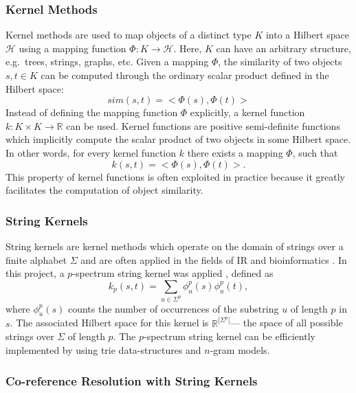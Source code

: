 \subsubsection{Kernel Methods}
Kernel methods are used to map objects of a
distinct type $K$ into a Hilbert space $\mathcal{H}$ using a mapping function $\Phi :
K \rightarrow \mathcal{H}$. Here, $K$ can have an arbitrary structure, e.g.\ trees, strings,
graphs, etc. Given a mapping $\Phi$, the similarity of two objects $s,t \in K$ can be computed
through the ordinary scalar product defined in the Hilbert space:
\[sim(s,t) = <\Phi(s),\Phi(t)>\]
Instead of defining the mapping function $\Phi$ explicitly, a kernel function $k : K \times K
\rightarrow \mathbb{R}$ can be used. Kernel functions are positive semi-definite functions
which implicitly compute the scalar product of two objects in some Hilbert space. In other words, for every
kernel function $k$ there exists a mapping $\Phi$, such that
\[k(s,t) = <\Phi(s),\Phi(t)>.\]
This property of kernel functions is often exploited in practice because it greatly facilitates the
computation of object similarity.

\subsubsection{String Kernels}
String kernels are kernel methods which operate on the domain of strings over
a finite alphabet $\Sigma$ and are often applied in the fields of IR and bioinformatics . In this project, a
$p$-spectrum string kernel was applied , defined as
\[k_p(s,t) = \sum_{u \in \Sigma^p}{\phi_u^p(s)\phi_u^p(t)},\]
where $\phi_u^p(s)$ counts the number of occurrences of the substring $u$ of length $p$ in $s$. The
associated Hilbert space for this kernel is $\mathbb{R}^{|\Sigma^p|}$--- the space of all possible
strings over $\Sigma$ of length $p$. The $p$-spectrum string kernel can be efficiently implemented by using trie data-structures and $n$-gram models.


\subsubsection{Co-reference Resolution with String Kernels}
\label{sec:co_reference_resolution_by_string_kernels}

